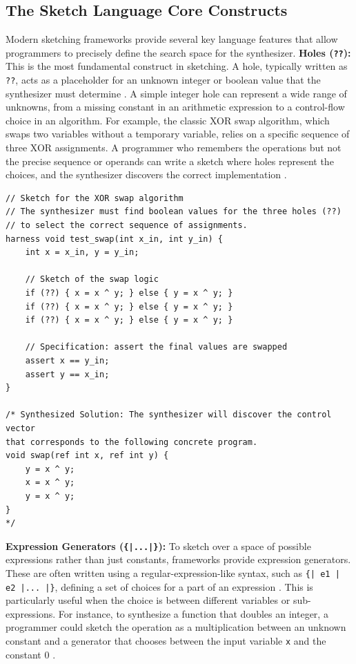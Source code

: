 \documentclass[12pt, a4paper]{report}
\begin{document}
\subsection{The Sketch Language Core Constructs}
Modern sketching frameworks provide several key language features that allow programmers to precisely define the search space for the synthesizer. \textbf{Holes (\texttt{??}):} This is the most fundamental construct in sketching. A hole, typically written as \texttt{??}, acts as a placeholder for an unknown integer or boolean value that the synthesizer must determine \citep{solar2013sketch}. A simple integer hole can represent a wide range of unknowns, from a missing constant in an arithmetic expression to a control-flow choice in an algorithm. For example, the classic XOR swap algorithm, which swaps two variables without a temporary variable, relies on a specific sequence of three XOR assignments. A programmer who remembers the operations but not the precise sequence or operands can write a sketch where holes represent the choices, and the synthesizer discovers the correct implementation \citep{solar2008program}.

\begin{verbatim}
// Sketch for the XOR swap algorithm
// The synthesizer must find boolean values for the three holes (??)
// to select the correct sequence of assignments.
harness void test_swap(int x_in, int y_in) {
    int x = x_in, y = y_in;
    
    // Sketch of the swap logic
    if (??) { x = x ^ y; } else { y = x ^ y; }
    if (??) { x = x ^ y; } else { y = x ^ y; }
    if (??) { x = x ^ y; } else { y = x ^ y; }

    // Specification: assert the final values are swapped
    assert x == y_in;
    assert y == x_in;
}

/* Synthesized Solution: The synthesizer will discover the control vector
that corresponds to the following concrete program.
void swap(ref int x, ref int y) {
    y = x ^ y;
    x = x ^ y;
    y = x ^ y;
}
*/
\end{verbatim}

\textbf{Expression Generators (\texttt{\{|...|\}}):} To sketch over a space of possible expressions rather than just constants, frameworks provide expression generators. These are often written using a regular-expression-like syntax, such as \texttt{\{| e1 | e2 |... |\}}, defining a set of choices for a part of an expression \citep{solar2008program}. This is particularly useful when the choice is between different variables or sub-expressions. For instance, to synthesize a function that doubles an integer, a programmer could sketch the operation as a multiplication between an unknown constant and a generator that chooses between the input variable \texttt{x} and the constant 0 \citep{singh2016jsketch}.
\end{document}
